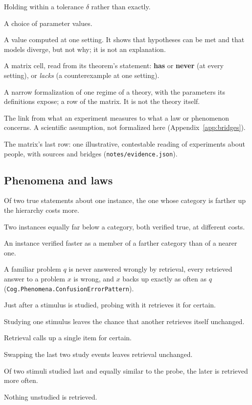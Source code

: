 \documentclass[11pt]{article}
\newcommand{\code}[1]{\texttt{#1}}
\newcommand{\lean}[1]{\texttt{#1}}
\begin{document}
\begin{description}[leftmargin=1em,itemsep=1pt,font=\normalfont\itshape]
\item[Graded.] Holding within a tolerance $\delta$ rather than exactly.
\item[Setting.] A choice of parameter values.
\item[Witness.] A value computed at one setting. It shows that hypotheses can be met and that models diverge, but not why; it is not an explanation.
\item[Verdict.] A matrix cell, read from its theorem's statement: \textbf{has} or \textbf{never} (at every setting), or \emph{lacks} (a counterexample at one setting).
\item[Formalized family.] A narrow formalization of one regime of a theory, with the parameters its definitions expose; a row of the matrix. It is not the theory itself.
\item[Bridge.] The link from what an experiment measures to what a law or phenomenon concerns. A scientific assumption, not formalized here (Appendix~\ref{app:bridges}).
\item[Interpretation of the evidence.] The matrix's last row: one illustrative, contestable reading of experiments about people, with sources and bridges (\code{notes/evidence.json}).
\end{description}

\subsection*{Phenomena and laws}
\begin{description}[leftmargin=1em,itemsep=1pt,font=\normalfont\itshape]
\item[Distance effect.] Of two true statements about one instance, the one whose category is farther up the hierarchy costs more.
\item[Typicality effect.] Two instances equally far below a category, both verified true, at different costs.
\item[Reversal.] An instance verified faster as a member of a farther category than of a nearer one.
\item[Confusion-error pattern.] A familiar problem $q$ is never answered wrongly by retrieval, every retrieved answer to a problem $x$ is wrong, and $x$ backs up exactly as often as $q$ (\lean{Cog.Phenomena.ConfusionErrorPattern}).
\item[Certainty.] Just after a stimulus is studied, probing with it retrieves it for certain.
\item[Stability.] Studying one stimulus leaves the chance that another retrieves itself unchanged.
\item[Determinacy.] Retrieval calls up a single item for certain.
\item[Order-freedom.] Swapping the last two study events leaves retrieval unchanged.
\item[Recency.] Of two stimuli studied last and equally similar to the probe, the later is retrieved more often.
\item[Stored-only.] Nothing unstudied is retrieved.
\end{description}
\end{document}
